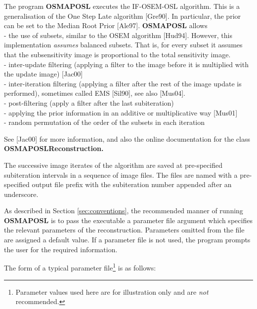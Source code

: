 \documentclass{article}
\newcommand{\tab}{\hspace{5mm}}
\begin{document}
The program \textbf{OSMAPOSL} executes the IF-OSEM-OSL algorithm. 
This is a generalisation of the One Step Late algorithm [Gre90]. In 
particular, the prior can be set to the Median Root Prior [Ale97]. \textbf{OSMAPOSL} 
allows \\
-\tab 
the use of subsets, similar to the OSEM algorithm [Hud94]. However, 
this implementation \textit{assumes} balanced subsets. That is, for 
every subset it assumes that the subsensitivity image is proportional 
to the total sensitivity image.\\
-\tab 
inter-update filtering (applying a filter to the image before 
it is multiplied with the update image) [Jac00]\\
-\tab 
inter-iteration filtering (applying a filter after the rest of 
the image update is performed), sometimes called EMS [Sil90], 
see also [Mus04].\\
-\tab 
post-filtering (apply a filter after the last subiteration)\\
-\tab 
applying the prior information in an additive or multiplicative 
way [Mus01]\\
-\tab 
random permutation of the order of the subsets in each iteration


See [Jac00] for more information, and also the online documentation 
for the class \textbf{OSMAPOSLReconstruction.}


The successive image iterates of the algorithm are saved at pre-specified 
subiteration intervals in a sequence of image files. The files 
are named with a pre-specified output file prefix with the subiteration 
number appended after an underscore.


As described in Section \ref{sec:conventions}, 
the recommended manner of running \textbf{OSMAPOSL} 
is to pass the executable a parameter file argument which specifies 
the relevant parameters of the reconstruction. Parameters omitted 
from the file are assigned a default value. If a parameter file 
is not used, the program prompts the user for the required information. 



The form of a typical parameter file\footnote{Parameter values used here are for
illustration only and are \textit{not} recommended.} is as follows:
\end{document}
